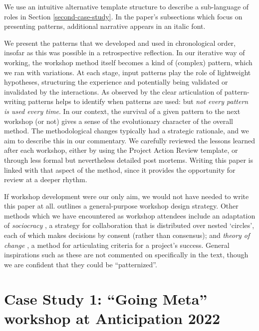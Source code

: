 \documentclass[acmlarge,timestamp]{acmart}
\begin{document}
We use an intuitive alternative template structure to describe a
sub-language of roles in Section \ref{second-case-study}.  In the
paper’s subsections which focus on presenting patterns, additional
narrative appears in an italic font.

We present the patterns that we developed and used in chronological
order, insofar as this was possible in a retrospective reflection.  In
our iterative way of working, the workshop method itself becomes a
kind of (complex) pattern, which we ran with variations.  At each
stage, input patterns play the role of lightweight hypotheses,
structuring the experience and potentially being validated or
invalidated by the interactions.  As observed by
\citet{iba2016pattern} the clear articulation of pattern-writing
patterns helps to identify when patterns are used: but \emph{not every
pattern is used every time}.  In our context, the survival of a given
pattern to the next workshop (or not) gives a sense of the
evolutionary character of the overall method.  The methodological
changes typically had a strategic rationale, and we aim to describe
this in our commentary.  We carefully reviewed the lessons learned
after each workshop, either by using the Project Action Review
template, or through less formal but nevertheless detailed post
mortems.  Writing this paper is linked with that aspect of the method,
since it provides the opportunity for review at a deeper rhythm.

If workshop development were our only aim, we would not have needed to
write this paper at all. \citet{miller-workshops} outlines a
general-purpose workshop design strategy.  Other methods which we have
encountered as workshop attendees include an adaptation of
\emph{sociocracy} \cite{sociocracy-manual}, a strategy for
collaboration that is distributed over nested ‘circles’, each of which
makes decisions by consent (rather than consensus); and \emph{theory
of change} \cite{Coryn2010}, a method for articulating criteria for a
project’s success.  General inspirations such as these are not
commented on specifically in the text, though we are confident that
they could be “patternized”.

\clearpage

\section{Case Study 1: “Going Meta” workshop at Anticipation 2022}\label{anticipation-case-study}
\end{document}
